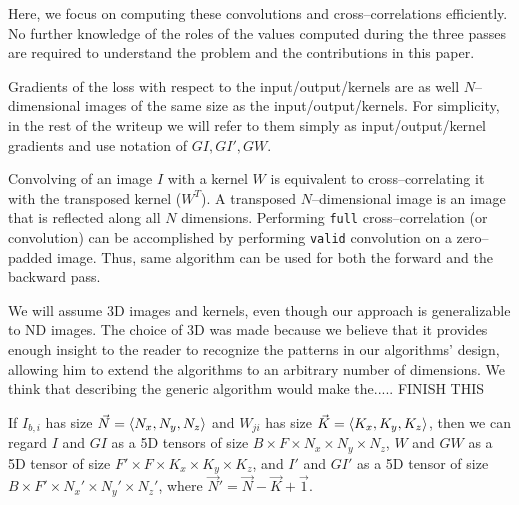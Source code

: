   Here, we focus on computing these convolutions and
  cross--correlations efficiently.  No further knowledge of the roles
  of the values computed during the three passes are required to
  understand the problem and the contributions in this paper.

  Gradients of the loss with respect to the input/output/kernels are
  as well $N$--dimensional images of the same size as the
  input/output/kernels.  For simplicity, in the rest of the writeup we
  will refer to them simply as input/output/kernel gradients and use
  notation of $GI, GI', GW$.

  Convolving of an image $I$ with a kernel $W$ is equivalent to
  cross--correlating it with the transposed kernel ($W^T$).  A
  transposed $N$--dimensional image is an image that is reflected
  along all $N$ dimensions.  Performing \texttt{full}
  cross--correlation (or convolution) can be accomplished by
  performing \texttt{valid} convolution on a zero--padded image.
  Thus, same algorithm can be used for both the forward and the
  backward pass.

  We will assume 3D images and kernels, even though our approach is
  generalizable to ND images.  The choice of 3D was made because we
  believe that it provides enough insight to the reader to recognize
  the patterns in our algorithms' design, allowing him to extend the
  algorithms to an arbitrary number of dimensions.  We think that
  describing the generic algorithm would make the..... FINISH THIS


  If $I_{b,i}$ has size $\vec{N} = \langle N_x, N_y, N_z\rangle$ and
  $W_{ji}$ has size $\vec{K} = \langle K_x,K_y,K_z\rangle$, then we can
  regard $I$ and $GI$ as a 5D tensors of size $B \times F \times N_x
  \times N_y \times N_z$, $W$ and $GW$ as a 5D tensor of size $F'
  \times F \times K_x \times K_y \times K_z$, and $I'$ and $GI'$ as a
  5D tensor of size $B \times F' \times N_x' \times N_y' \times N_z'$,
  where $\vec{N}' = \vec{N} - \vec{K} + \vec{1}$.
